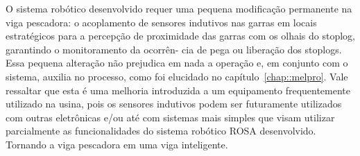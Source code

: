O sistema robótico desenvolvido requer uma pequena modificação permanente na
viga pescadora: o acoplamento de sensores indutivos nas garras em locais
estratégicos para a percepção de proximidade das garras com os olhais do
stoplog, garantindo o monitoramento da ocorrên- cia de pega ou liberação dos
stoplogs. Essa pequena alteração não prejudica em nada a operação e, em
conjunto com o sistema, auxilia no processo, como foi elucidado no
capítulo~\ref{chap::melpro}. Vale ressaltar que esta é uma melhoria
introduzida a um equipamento frequentemente utilizado na usina, pois os
sensores indutivos podem ser futuramente utilizados com outras eletrônicas e/ou
até com sistemas mais simples que visam utilizar parcialmente as
funcionalidades do sistema robótico ROSA desenvolvido. Tornando a viga
pescadora em uma viga inteligente.

